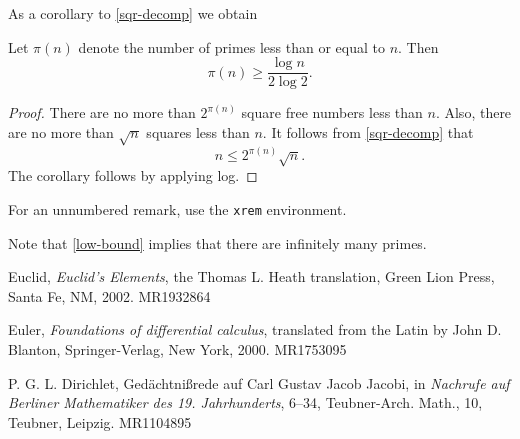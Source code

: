 \documentclass{rhumj_new}
\begin{document}
As a corollary to \cref{sqr-decomp} we obtain

\begin{corollary} \label{low-bound} Let $\pi(n)$ denote the number of primes less than or equal to $n$. Then
\[ \pi(n) \geq \frac{\log n}{2\log 2}.\]
\end{corollary}

\begin{proof} There are no more than $2^{\pi(n)}$ square free numbers less than $n$. Also, there are no more than $\sqrt{n}$ squares less than $n$. It follows from \cref{sqr-decomp} that 
\[ n \leq 2^{\pi(n)} \sqrt{n}.\]
The corollary follows by applying log.
\end{proof}

For an unnumbered remark, use the \texttt{xrem} environment.
\begin{xrem} Note that \cref{low-bound} implies that there are infinitely many primes.
\end{xrem}

\begin{thebibliography}{10}


Euclid, {\it Euclid's {\it Elements}}, the Thomas L. Heath translation, Green Lion Press, Santa Fe, NM, 2002. MR1932864

Euler, {\it Foundations of differential calculus}, translated from the Latin by John D. Blanton, Springer-Verlag, New York, 2000. MR1753095

P. G. L. Dirichlet, Ged\"{a}chtni\ss rede auf Carl Gustav Jacob Jacobi, in {\it Nachrufe auf Berliner Mathematiker des 19. Jahrhunderts}, 6--34, Teubner-Arch. Math., 10, Teubner, Leipzig. MR1104895

\end{thebibliography}
\end{document}
